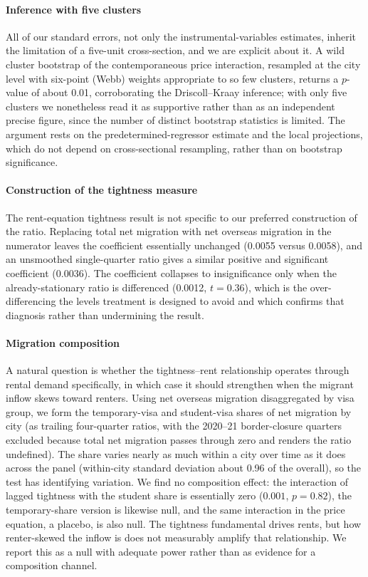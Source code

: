 \documentclass[preprint,11pt,authoryear]{elsarticle}
\begin{document}
\begin{appendices}
\paragraph{Inference with five clusters}
All of our standard errors, not only the instrumental-variables estimates,
inherit the limitation of a five-unit cross-section, and we are explicit about
it. A wild cluster bootstrap of the contemporaneous price interaction, resampled
at the city level with six-point (Webb) weights appropriate to so few clusters,
returns a $p$-value of about 0.01, corroborating the Driscoll--Kraay inference;
with only five clusters we nonetheless read it as supportive rather than as an
independent precise figure, since the number of distinct bootstrap statistics is
limited. The argument rests on the predetermined-regressor estimate
and the local projections, which do not depend on cross-sectional resampling,
rather than on bootstrap significance.

\paragraph{Construction of the tightness measure}
The rent-equation tightness result is not specific to our preferred construction
of the ratio. Replacing total net migration with net overseas migration in the
numerator leaves the coefficient essentially unchanged (0.0055 versus 0.0058),
and an unsmoothed single-quarter ratio gives a similar positive and significant
coefficient (0.0036). The coefficient collapses to insignificance only when the
already-stationary ratio is differenced (0.0012, $t = 0.36$), which is the
over-differencing the levels treatment is designed to avoid and which confirms
that diagnosis rather than undermining the result.

\paragraph{Migration composition}
A natural question is whether the tightness--rent relationship operates through
rental demand specifically, in which case it should strengthen when the migrant
inflow skews toward renters. Using net overseas migration disaggregated by visa
group, we form the temporary-visa and student-visa shares of net migration by
city (as trailing four-quarter ratios, with the 2020--21 border-closure quarters
excluded because total net migration passes through zero and renders the ratio
undefined). The share varies nearly as much within a city over time as it does
across the panel (within-city standard deviation about 0.96 of the overall), so
the test has identifying variation. We find no composition effect: the
interaction of lagged tightness with the student share is essentially zero
($0.001$, $p = 0.82$), the temporary-share version is likewise null, and the
same interaction in the price equation, a placebo, is also null. The tightness
fundamental drives rents, but how renter-skewed the inflow is does not measurably
amplify that relationship. We report this as a null with adequate power rather
than as evidence for a composition channel.


\end{appendices}
\end{document}
